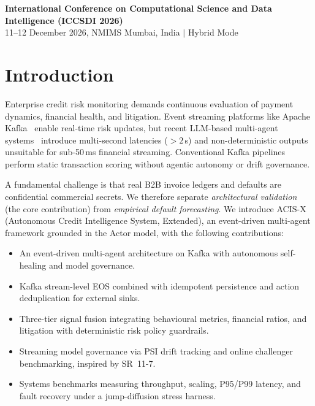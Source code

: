 \documentclass[pdflatex,sn-mathphys-num]{sn-jnl}
\theoremstyle{thmstyleone}
\theoremstyle{thmstyletwo}
\theoremstyle{thmstylethree}
\begin{document}
\begin{center}
\small
\textbf{International Conference on Computational Science and Data Intelligence (ICCSDI 2026)}\\
11--12 December 2026, NMIMS Mumbai, India $\vert$ Hybrid Mode
\end{center}
\vspace{0.2em}

\renewcommand{\theHtable}{\thesection.\arabic{table}}

\section{Introduction}\label{sec:introduction}

Enterprise credit risk monitoring demands continuous evaluation of payment dynamics, financial health, and litigation. Event streaming platforms like Apache Kafka~\cite{kreps2011kafka} enable real-time risk updates, but recent LLM-based multi-agent systems~\cite{jajoo2025masca} introduce multi-second latencies ($>2$\,s) and non-deterministic outputs unsuitable for sub-50\,ms financial streaming. Conventional Kafka pipelines perform static transaction scoring without agentic autonomy or drift governance.

A fundamental challenge is that real B2B invoice ledgers and defaults are confidential commercial secrets. We therefore separate \textit{architectural validation} (the core contribution) from \textit{empirical default forecasting}. We introduce ACIS-X (Autonomous Credit Intelligence System, Extended), an event-driven multi-agent framework grounded in the Actor model, with the following contributions:
\begin{itemize}
\setlength{\itemsep}{1pt}\setlength{\parskip}{0pt}
\item An event-driven multi-agent architecture on Kafka with autonomous self-healing and model governance.
\item Kafka stream-level EOS combined with idempotent persistence and action deduplication for external sinks.
\item Three-tier signal fusion integrating behavioural metrics, financial ratios, and litigation with deterministic risk policy guardrails.
\item Streaming model governance via PSI drift tracking and online challenger benchmarking, inspired by SR~11-7.
\item Systems benchmarks measuring throughput, scaling, P95/P99 latency, and fault recovery under a jump-diffusion stress harness.
\end{itemize}
\end{document}
